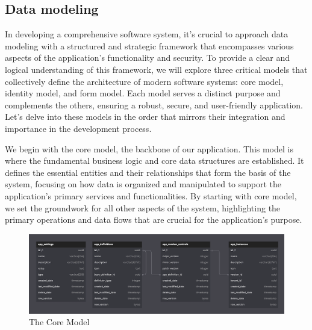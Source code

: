 
\subsection{Data modeling}
In developing a comprehensive software system, it's crucial to approach data
modeling with a structured and strategic framework that encompasses various
aspects of the application's functionality and security. To provide a clear and
logical understanding of this framework, we will explore three critical models
that collectively define the architecture of modern software systems:
core model, identity model, and form model. Each model serves a distinct purpose and
complements the others, ensuring a robust, secure, and user-friendly
application. Let's delve into these models in the order that mirrors their
integration and importance in the development process.

We begin with the core model, the backbone of our application. This model is
where the fundamental business logic and core data structures are established.
It defines the essential entities and their relationships that form the basis of
the system, focusing on how data is organized and manipulated to support the
application’s primary services and functionalities. By starting with core model,
we set the groundwork for all other aspects of the system, highlighting the
primary operations and data flows that are crucial for the application's
purpose.
\begin{figure}[H]
  \centering
  \includegraphics[width=\linewidth]{Images/model_core.png}
  \vspace{1em}
  \caption{The Core Model}
\end{figure}

